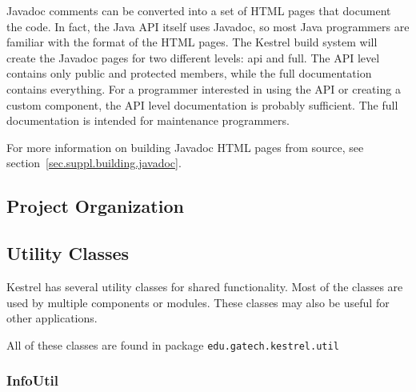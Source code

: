 Javadoc comments can be converted into a set of HTML pages that document the code. In fact, the Java API itself uses Javadoc, so most Java programmers are familiar with the format of the HTML pages. The Kestrel build system will create the Javadoc pages for two different levels: api and full. The API level contains only public and protected members, while the full documentation contains everything. For a programmer interested in using the API or creating a custom component, the API level documentation is probably sufficient. The full documentation is intended for maintenance programmers.

For more information on building Javadoc HTML pages from source, see section~\ref{sec.suppl.building.javadoc}.


\subsection{Project Organization}
\label{sec.suppl.organization}



\subsection{Utility Classes}
\label{sec.api.util}

Kestrel has several utility classes for shared functionality. Most of the classes are used by multiple components or modules. These classes may also be useful for other applications.

All of these classes are found in package \texttt{edu.gatech.kestrel.util}

\subsubsection{InfoUtil}
\label{sec.api.util.infoutil}

